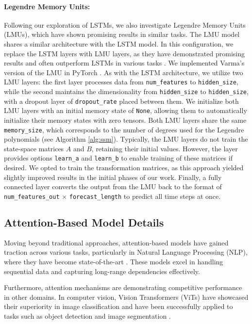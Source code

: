 \paragraph{Legendre Memory Units:} 
\label{sec:lmu-details}
Following our exploration of LSTMs, we also investigate Legendre Memory Units (LMUs), which have shown promising results in similar tasks. The LMU model shares a similar architecture with the LSTM model. In this configuration, we replace the LSTM layers with LMU layers, as they have demonstrated promising results and often outperform LSTMs in various tasks \cite{gosalci, lmu}. We implemented Varma's version of the LMU in PyTorch \cite{torch-lmu}. As with the LSTM architecture, we utilize two LMU layers: the first layer processes data from \texttt{num\_features} to \texttt{hidden\_size}, while the second maintains the dimensionality from \texttt{hidden\_size} to \texttt{hidden\_size}, with a dropout layer of \texttt{dropout\_rate} placed between them. We initialize both LMU layers with an initial memory state of \texttt{None}, allowing them to automatically initialize their memory states with zero tensors. Both LMU layers share the same \texttt{memory\_size}, which corresponds to the number of degrees used for the Legendre polynomials (see Algorithm \ref{alg:ssm}). Typically, the LMU layers do not train the state-space matrices $A$ and $B$, retaining their initial values. However, the layer provides options \texttt{learn\_a} and \texttt{learn\_b} to enable training of these matrices if desired. We opted to train the transformation matrices, as this approach yielded slightly improved results in the initial phases of our work. Finally, a fully connected layer converts the output from the LMU back to the format of \texttt{num\_features\_out} $\times$ \texttt{forecast\_length} to predict all time steps at once.

\subsection{Attention-Based Model Details}

Moving beyond traditional approaches, attention-based models have gained traction across various tasks, particularly in Natural Language Processing (NLP), where they have become state-of-the-art \cite{gpt, bloom, opt, llama, bert, claude, gemini}. These models excel in handling sequential data and capturing long-range dependencies effectively.

Furthermore, attention mechanisms are demonstrating competitive performance in other domains. In computer vision, Vision Transformers (ViTs) have showcased their superiority in image classification and have been successfully applied to tasks such as object detection and image segmentation \cite{dosovitskiy2020, carion2020}.

